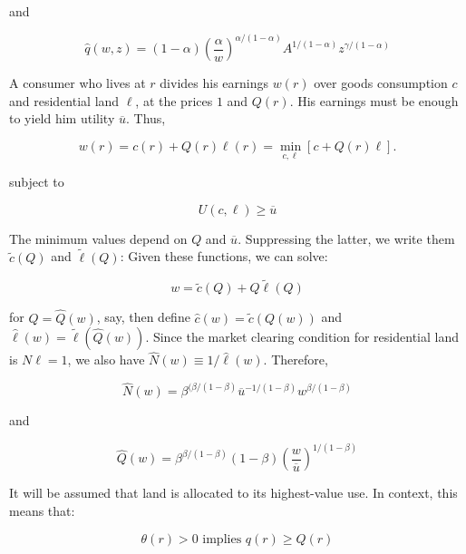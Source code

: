 and

\begin{equation*}
    \hat{q}(w, z) = (1 - \alpha) (\frac{\alpha}{w})^{\alpha / (1 - \alpha)} A^{1 / (1 - \alpha)} z^{\gamma / (1 - \alpha)}
\end{equation*}

A consumer who lives at $r$ divides his earnings $w(r)$ over goods consumption $c$ and residential land $\ell$, at the prices $1$ and $Q(r)$. His earnings must be enough to yield him utility $\overline{u}$. Thus,

\begin{equation}
    w(r) = c(r) + Q(r)\ell(r) = \min_{c, \ell} [c + Q(r)\ell].
\end{equation}

subject to

\begin{equation*}
    U(c, \ell) \geq \overline{u}
\end{equation*}

The minimum values depend on $Q$ and $\overline{u}$. Suppressing the latter, we write them $\tilde{c}(Q)$ and $\tilde{\ell}(Q)$: Given these functions, we can solve:

\begin{equation*}
    w = \tilde{c}(Q) + Q\tilde{\ell}(Q)
\end{equation*}

for $Q = \hat{Q}(w)$, say, then define $\hat{c}(w) = \tilde{c}(Q(w))$ and $\hat{\ell}(w) = \tilde{\ell}(\hat{Q}(w))$. Since the market clearing condition for residential land is $N\ell = 1$, we also have $\hat{N}(w) \equiv 1/\hat{\ell}(w)$. Therefore,

\begin{equation*}
    \hat{N}(w) = \beta^{(\beta / (1 - \beta)}\overline{u}^{-1/(1 - \beta)}w^{\beta / (1 - \beta)}
\end{equation*}

and

\begin{equation*}
    \hat{Q}(w) = \beta^{\beta / (1 - \beta)} (1 - \beta) (\frac{w}{\overline{u}})^{1 / (1 - \beta)}
\end{equation*}

It will be assumed that land is allocated to its highest-value use. In context, this means that:

\begin{equation}
    \theta(r) > 0 \text{ implies } q(r) \geq Q(r)
\end{equation}

